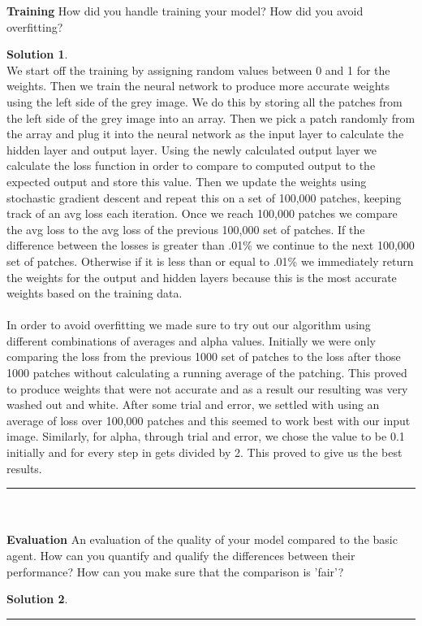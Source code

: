 \documentclass{article}
\theoremstyle{definition}
\def\fline{\rule{0.75\linewidth}{0.5pt}}
\newcommand{\finishline}{\vspace{-15pt}\begin{center}\fline\end{center}}
\newtheorem*{solution*}{Solution}
\newenvironment{solution}{\begin{solution*}}{{\finishline} \end{solution*}}
\begin{document}
    \textbf{Training}
        How did you handle training your model? How did you avoid overfitting? 
        \begin{solution} \hfill \\
        We start off the training by assigning random values between 0 and 1 for the weights. Then we train the neural network to produce more accurate weights using the left side of the grey image. We do this by storing all the patches from the left side of the grey image into an array. Then we pick a patch randomly from the array and plug it into the neural network as the input layer to calculate the hidden layer and output layer. Using the newly calculated output layer we calculate the loss function in order to compare to computed output to the expected output and store this value. Then we update the weights using stochastic gradient descent and repeat this on a set of 100,000 patches, keeping track of an avg loss each iteration. Once we reach 100,000 patches we compare the avg loss to the avg loss of the previous 100,000 set of patches. If the difference between the losses is greater than .01\% we continue to the next 100,000 set of patches. Otherwise if it is less than or equal to .01\% we immediately return the weights for the output and hidden layers because this is the most accurate weights based on the training data.\\\\
        In order to avoid overfitting we made sure to try out our algorithm using different combinations of averages and alpha values. Initially we were only comparing the loss from the previous 1000 set of patches to the loss after those 1000 patches without calculating a running average of the patching. This proved to produce weights that were not accurate and as a result our resulting was very washed out and white. After some trial and error, we settled with using an average of loss over 100,000 patches and this seemed to work best with our input image. Similarly, for alpha, through trial and error, we chose the value to be 0.1 initially and for every step in gets divided by 2. This proved to give us the best results.
        \end{solution}\\\\
        
    \textbf{Evaluation}
        An evaluation of the quality of your model compared to the basic agent. How can you quantify and qualify the differences between their performance? How can you make sure that the comparison is 'fair'? 
        \begin{solution} \hfill \\
    
        \end{solution}\\\\
        
\end{document}
